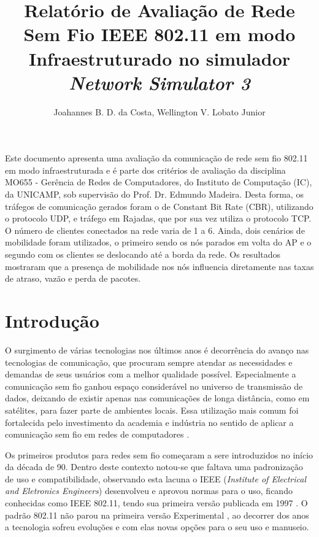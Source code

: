 \documentclass[12pt]{article}
\title{Relatório de Avaliação de Rede Sem Fio IEEE 802.11 em modo Infraestruturado no simulador \textit{Network Simulator 3}}
\author{Joahannes B. D. da Costa\inst{1}, Wellington V. Lobato Junior\inst{1}}
\begin{document}
 

\maketitle

\begin{resumo} 
Este documento apresenta uma avaliação da comunicação de rede sem fio 802.11 em modo infraestruturada e é parte dos critérios de avaliação da disciplina MO655 - Gerência de Redes de Computadores, do Instituto de Computação (IC), da UNICAMP, sob supervisão do Prof. Dr. Edmundo Madeira. Desta forma, os tráfegos de comunicação gerados foram o de Constant Bit Rate (CBR), utilizando o protocolo UDP, e tráfego em Rajadas, que por sua vez utiliza o protocolo TCP. O número de clientes conectados na rede varia de 1 a 6. Ainda, dois cenários de mobilidade foram utilizados, o primeiro sendo os nós parados em volta do AP e o segundo com os clientes se deslocando até a borda da rede. Os resultados mostraram que a presença de mobilidade nos nós influencia diretamente nas taxas de atraso, vazão e perda de pacotes. 
\end{resumo}


\section{Introdução}


O surgimento de várias tecnologias nos últimos anos é decorrência do avanço nas tecnologias de comunicação, que procuram sempre atendar as necessidades e demandas de seus usuários com a melhor qualidade possível. Especialmente a comunicação sem fio ganhou espaço considerável no universo de transmissão de dados, deixando de existir apenas nas comunicações de longa distância, como em satélites, para fazer parte de ambientes locais. Essa utilização mais comum foi fortalecida pelo investimento da academia e indústria no sentido de aplicar a comunicação sem fio em redes de computadores \cite{gtaredesemfio}.

Os primeiros produtos para redes sem fio começaram a sere introduzidos no início da década de 90. Dentro deste contexto notou-se que faltava uma padronização de uso e compatibilidade, observando esta lacuna o IEEE (\textit{Institute of Electrical and Eletronics Engineers}) desenvolveu e aprovou normas para o uso, ficando conhecidas como IEEE 802.11, tendo sua primeira versão publicada em 1997 \cite{batalha2018}. O padrão 802.11 não parou na primeira versão Experimental \cite{tanenbaum2003computer}, ao decorrer dos anos a tecnologia sofreu evoluções e com elas novas opções para o seu uso e manuseio.
\end{document}
